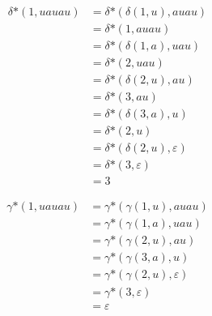 \documentclass[a4paper, 12pt, margins=3cm]{homework}
\begin{document}
\begin{solution}
  \begin{minipage}{0.5\textwidth}
    \begin{center}
      \begin{align*}
        \delta\text{*}(1, uauau) &= \delta\text{*}(\delta(1,u), auau) \\
        &= \delta\text{*}(1, auau) \\
        &= \delta\text{*}(\delta(1,a), uau) \\
        &= \delta\text{*}(2, uau) \\
        &= \delta\text{*}(\delta(2,u), au) \\
        &= \delta\text{*}(3, au) \\
        &= \delta\text{*}(\delta(3,a), u) \\
        &= \delta\text{*}(2, u) \\
        &= \delta\text{*}(\delta(2,u), \varepsilon) \\
        &= \delta\text{*}(3, \varepsilon) \\
        &= 3
      \end{align*}
    \end{center}
  \end{minipage}
  \begin{minipage}{0.5\textwidth}
    \begin{center}
      \begin{align*}
        \gamma\text{*}(1, uauau) &= \gamma\text{*}(\gamma(1, u), auau) \\
        &= \gamma\text{*}(\gamma(1, a), uau) \\
        &= \gamma\text{*}(\gamma(2, u), au) \\
        &= \gamma\text{*}(\gamma(3, a), u) \\
        &= \gamma\text{*}(\gamma(2, u), \varepsilon) \\
        &= \gamma\text{*}(3, \varepsilon) \\
        &= \varepsilon
      \end{align*}
    \end{center}
  \end{minipage}
\end{solution}
\end{document}
